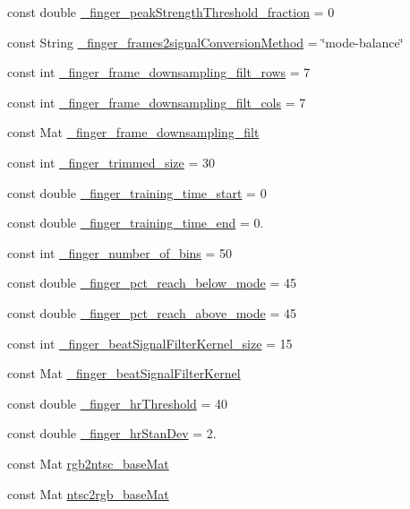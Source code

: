 \begin{DoxyCompactItemize}
const double \hyperlink{namespace_m_h_r_a417e8c2df65251a5a34b250f975a3867}{\+\_\+finger\+\_\+peak\+Strength\+Threshold\+\_\+fraction} = 0
\item 
const String \hyperlink{namespace_m_h_r_a4c571f87fe52934440add1a3a5a98e14}{\+\_\+finger\+\_\+frames2signal\+Conversion\+Method} = \char`\"{}mode-\/balance\char`\"{}
\item 
const int \hyperlink{namespace_m_h_r_a5d49af784fd77df019705d26d3654953}{\+\_\+finger\+\_\+frame\+\_\+downsampling\+\_\+filt\+\_\+rows} = 7
\item 
const int \hyperlink{namespace_m_h_r_a2c854934355cedc3760bfddd3bcd03a6}{\+\_\+finger\+\_\+frame\+\_\+downsampling\+\_\+filt\+\_\+cols} = 7
\item 
const Mat \hyperlink{namespace_m_h_r_a9a40d6696920c99016b2c4cc40e8db3b}{\+\_\+finger\+\_\+frame\+\_\+downsampling\+\_\+filt}
\item 
const int \hyperlink{namespace_m_h_r_a8a6e23a5b4183588a231061fe7d43524}{\+\_\+finger\+\_\+trimmed\+\_\+size} = 30
\item 
const double \hyperlink{namespace_m_h_r_afcd48923eb1d7b2aff98acc4cf2a9d24}{\+\_\+finger\+\_\+training\+\_\+time\+\_\+start} = 0
\item 
const double \hyperlink{namespace_m_h_r_a69b9408e97af3e5261c4ede559d9f7d6}{\+\_\+finger\+\_\+training\+\_\+time\+\_\+end} = 0.
\item 
const int \hyperlink{namespace_m_h_r_a1cd0eaa85c6115e1d53ad1c1a3209b41}{\+\_\+finger\+\_\+number\+\_\+of\+\_\+bins} = 50
\item 
const double \hyperlink{namespace_m_h_r_a9714df3caf979755314e0a049dd96368}{\+\_\+finger\+\_\+pct\+\_\+reach\+\_\+below\+\_\+mode} = 45
\item 
const double \hyperlink{namespace_m_h_r_a8c272379feda002b512fbc5e3e917000}{\+\_\+finger\+\_\+pct\+\_\+reach\+\_\+above\+\_\+mode} = 45
\item 
const int \hyperlink{namespace_m_h_r_a9b1303d740470ce969352e3173a27ebb}{\+\_\+finger\+\_\+beat\+Signal\+Filter\+Kernel\+\_\+size} = 15
\item 
const Mat \hyperlink{namespace_m_h_r_a7c6f13da1b28c69fdd787e07d05c7503}{\+\_\+finger\+\_\+beat\+Signal\+Filter\+Kernel}
\item 
const double \hyperlink{namespace_m_h_r_ad34bb64ea8d7aec01e0b4a8ae885c2a6}{\+\_\+finger\+\_\+hr\+Threshold} = 40
\item 
const double \hyperlink{namespace_m_h_r_a418b4c21db49ca7ed9f3546cc04f7210}{\+\_\+finger\+\_\+hr\+Stan\+Dev} = 2.
\item 
const Mat \hyperlink{namespace_m_h_r_a7191e886f0a618347db01d5743eb2856}{rgb2ntsc\+\_\+base\+Mat}
\item 
const Mat \hyperlink{namespace_m_h_r_a1ab4a7e6b45362de2827fd373b53ba24}{ntsc2rgb\+\_\+base\+Mat}
\end{DoxyCompactItemize}


